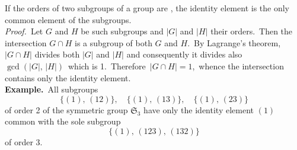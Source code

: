 \documentclass[12pt]{article}
\theoremstyle{definition}
\begin{document}
If the orders of two subgroups of a group are , the identity element is the only common element of the subgroups.\\

\emph{Proof.}\, Let $G$ and $H$ be such subgroups and $|G|$ and $|H|$ their orders.\, Then the intersection $G\!\cap\!H$ is a subgroup of both $G$ and $H$.\, By Lagrange's theorem, $|G\!\cap\!H|$ divides both $|G|$ and $|H|$ and consequently it divides also\, $\gcd(|G|,\,|H|)$\, which is 1.\, Therefore\, $|G\!\cap\!H| = 1$,\, whence the intersection contains only the identity element.\\

\textbf{Example.}\, All subgroups 
$$\{(1),\,(12)\},\quad \{(1),\,(13)\}, \quad \{(1),\,(23)\}$$
of order 2 of the symmetric group $\mathfrak{S}_3$ have only the identity element $(1)$ common with the sole subgroup
$$\{(1),\,(123),\,(132)\}$$
of order 3.
\end{document}
